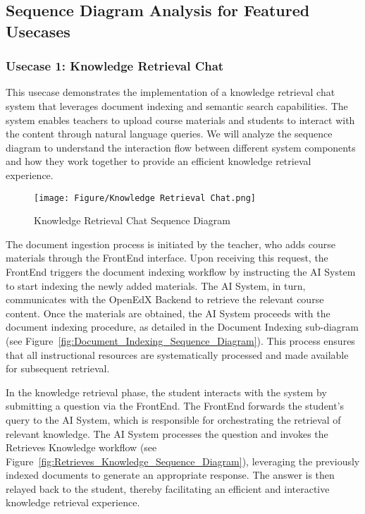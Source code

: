 \documentclass[../Main.tex]{subfiles}
\begin{document}
	\subsection{Sequence Diagram Analysis for Featured Usecases}
	\label{section:4.1.4_sequence_diagram_analysis_for_featured_usecases}
	\subsubsection{Usecase 1: Knowledge Retrieval Chat}
	This usecase demonstrates the implementation of a knowledge retrieval chat system
	that leverages document indexing and semantic search capabilities. The system
	enables teachers to upload course materials and students to interact with the
	content through natural language queries. We will analyze the sequence diagram
	to understand the interaction flow between different system components and how
	they work together to provide an efficient knowledge retrieval experience.

	\begin{figure}[H]
		\centering
		\texttt{[image: Figure/Knowledge Retrieval Chat.png]}
		\caption{Knowledge Retrieval Chat Sequence Diagram}
		\label{fig:Knowledge_Retrieval_Chat_Sequence_Diagram}
	\end{figure}
	The document ingestion process is initiated by the teacher, who adds course
	materials through the FrontEnd interface. Upon receiving this request, the
	FrontEnd triggers the document indexing workflow by instructing the AI System
	to start indexing the newly added materials. The AI System, in turn, communicates
	with the OpenEdX Backend to retrieve the relevant course content. Once the
	materials are obtained, the AI System proceeds with the document indexing procedure,
	as detailed in the Document Indexing sub-diagram (see Figure~\ref{fig:Document_Indexing_Sequence_Diagram}).
	This process ensures that all instructional resources are systematically processed
	and made available for subsequent retrieval.

	In the knowledge retrieval phase, the student interacts with the system by
	submitting a question via the FrontEnd. The FrontEnd forwards the student's query
	to the AI System, which is responsible for orchestrating the retrieval of
	relevant knowledge. The AI System processes the question and invokes the Retrieves
	Knowledge workflow (see Figure~\ref{fig:Retrieves_Knowledge_Sequence_Diagram}),
	leveraging the previously indexed documents to generate an appropriate
	response. The answer is then relayed back to the student, thereby facilitating
	an efficient and interactive knowledge retrieval experience.
\end{document}
